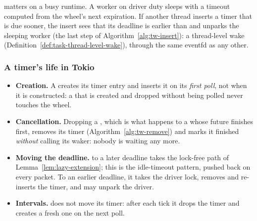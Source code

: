  matters on a busy runtime. A worker on driver duty sleeps with a timeout computed from the wheel's next expiration. If another thread inserts a timer that is due sooner, the insert sees that its deadline is earlier than  and unparks the sleeping worker (the last step of Algorithm~\ref{alg:tw-insert}): a thread-level wake (Definition~\ref{def:task-thread-level-wake}), through the same eventfd as any other.

\subsubsection{A timer's life in Tokio}

\begin{itemize}
    \item \textbf{Creation.} A  creates its timer entry and inserts it on its \emph{first poll}, not when it is constructed: a  that is created and dropped without being polled never touches the wheel.
    \item \textbf{Cancellation.} Dropping a , which is what happens to a  whose future finishes first, removes its timer (Algorithm~\ref{alg:tw-remove}) and marks it finished \emph{without} calling its waker: nobody is waiting any more.
    \item \textbf{Moving the deadline.}  to a later deadline takes the lock-free path of Lemma~\ref{lem:lazy-extension}; this is the idle-timeout pattern, pushed back on every packet. To an earlier deadline, it takes the driver lock, removes and re-inserts the timer, and may unpark the driver.
    \item \textbf{Intervals.}  does not move its timer: after each tick it drops the timer and creates a fresh one on the next poll.
\end{itemize}

